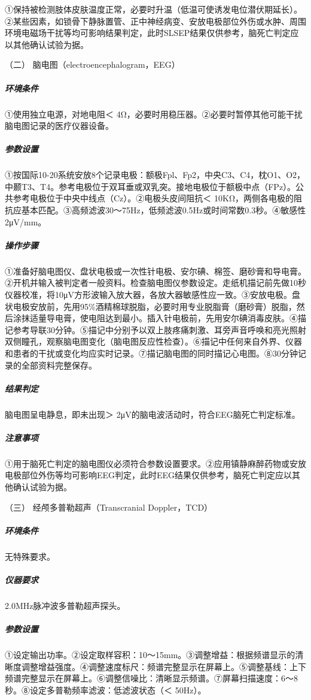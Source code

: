 ①保持被检测肢体皮肤温度正常，必要时升温（低温可使诱发电位潜伏期延长）。②某些因素，如锁骨下静脉置管、正中神经病变、安放电极部位外伤或水肿、周围环境电磁场干扰等均可影响结果判定，此时SLSEP结果仅供参考，脑死亡判定应以其他确认试验为据。

\hypertarget{text00069.htmlux5cux23CHP3-1-5-3-2}{}
（二） 脑电图（electroencephalogram，EEG）

\subparagraph{环境条件}

①使用独立电源，对地电阻＜
4Ω，必要时用稳压器。②必要时暂停其他可能干扰脑电图记录的医疗仪器设备。

\subparagraph{参数设置}

①按国际10-20系统安放8个记录电极：额极Fpl、Fp2，中央C3、C4，枕O1、O2，中颞T3、T4。参考电极位于双耳垂或双乳突。接地电极位于额极中点（FPz）。公共参考电极位于中央中线点（Cz）。②电极头皮间阻抗＜
10KΩ，两侧各电极的阻抗应基本匹配。③高频滤波30～75Hz，低频滤波0.5Hz或时间常数0.3秒。④敏感性2μV/mm。

\subparagraph{操作步骤}

①准备好脑电图仪、盘状电极或一次性针电极、安尔碘、棉签、磨砂膏和导电膏。②开机并输入被判定者一般资料。检查脑电图仪参数设定。走纸机描记前先做10秒仪器校准，将10μV方形波输入放大器，各放大器敏感性应一致。③安放电极。盘状电极安放前，先用95\%酒精棉球脱脂，必要时用专业脱脂膏（磨砂膏）脱脂，然后涂抹适量导电膏，使电阻达到最小。插入针电极前，先用安尔碘消毒皮肤。④描记参考导联30分钟。⑤描记中分别予以双上肢疼痛刺激、耳旁声音呼唤和亮光照射双侧瞳孔，观察脑电图变化（脑电图反应性检查）。⑥描记中任何来自外界、仪器和患者的干扰或变化均应实时记录。⑦描记脑电图的同时描记心电图。⑧30分钟记录的全部资料完整保存。

\subparagraph{结果判定}

脑电图呈电静息，即未出现＞ 2μV的脑电波活动时，符合EEG脑死亡判定标准。

\subparagraph{注意事项}

①用于脑死亡判定的脑电图仪必须符合参数设置要求。②应用镇静麻醉药物或安放电极部位外伤等均可影响EEG判定，此时EEG结果仅供参考，脑死亡判定应以其他确认试验为据。

\hypertarget{text00069.htmlux5cux23CHP3-1-5-3-3}{}
（三） 经颅多普勒超声（Transcranial Doppler，TCD）

\subparagraph{环境条件}

无特殊要求。

\subparagraph{仪器要求}

2.0MHz脉冲波多普勒超声探头。

\subparagraph{参数设置}

①设定输出功率。②设定取样容积：10～15mm。③调整增益：根据频谱显示的清晰度调整增益强度。④调整速度标尺：频谱完整显示在屏幕上。⑤调整基线：上下频谱完整显示在屏幕上。⑥调整信噪比：清晰显示频谱。⑦屏幕扫描速度：6～8秒。⑧设定多普勒频率滤波：低滤波状态（＜
50Hz）。


